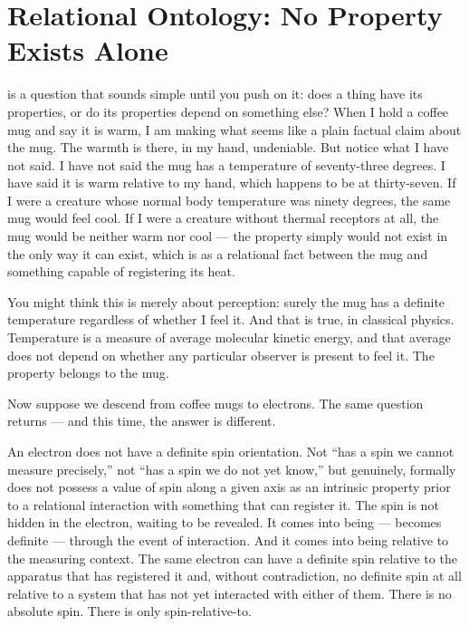 \chapter{Relational Ontology: No Property Exists Alone}
\label{ch:relational-ontology}


 is a question that sounds simple until you push on it: does a thing have its properties, or do its properties depend on something else?
When I hold a coffee mug and say it is warm, I am making what seems like a plain factual claim about the mug. The warmth is there, in my hand, undeniable. But notice what I have not said. I have not said the mug has a temperature of seventy-three degrees. I have said it is warm relative to my hand, which happens to be at thirty-seven. If I were a creature whose normal body temperature was ninety degrees, the same mug would feel cool. If I were a creature without thermal receptors at all, the mug would be neither warm nor cool --- the property simply would not exist in the only way it can exist, which is as a relational fact between the mug and something capable of registering its heat.

You might think this is merely about perception: surely the mug has a definite temperature regardless of whether I feel it. And that is true, in classical physics. Temperature is a measure of average molecular kinetic energy, and that average does not depend on whether any particular observer is present to feel it. The property belongs to the mug.

Now suppose we descend from coffee mugs to electrons. The same question returns --- and this time, the answer is different.

An electron does not have a definite spin orientation. Not ``has a spin we cannot measure precisely,'' not ``has a spin we do not yet know,'' but genuinely, formally does not possess a value of spin along a given axis as an intrinsic property prior to a relational interaction with something that can register it. The spin is not hidden in the electron, waiting to be revealed. It comes into being --- becomes definite --- through the event of interaction. And it comes into being relative to the measuring context. The same electron can have a definite spin relative to the apparatus that has registered it and, without contradiction, no definite spin at all relative to a system that has not yet interacted with either of them. There is no absolute spin. There is only spin-relative-to.

